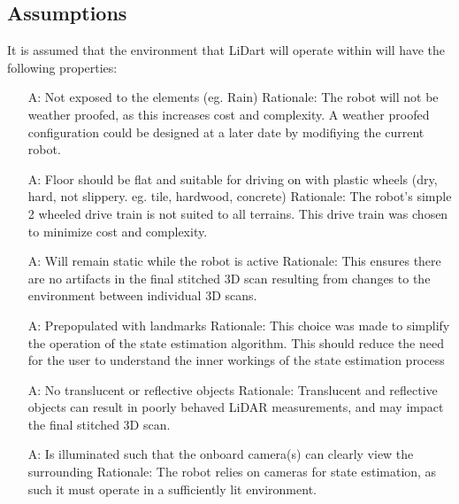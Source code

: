\documentclass[12pt]{article}
\newcounter{assumpnum} %
\begin{document}
\subsection{Assumptions}

It is assumed that the environment that LiDart will operate within will have the following properties:

\noindent \begin{itemize}
\item[A\refstepcounter{assumpnum}\theassumpnum \label{Assumption1}:] Not exposed to the elements (eg. Rain)
\newline Rationale: The robot will not be weather proofed, as this increases cost and complexity. A weather proofed configuration could be designed at a later date by modifiying the current robot.

\item[A\refstepcounter{assumpnum}\theassumpnum \label{Assumption2}:] Floor should be flat and suitable for driving on with plastic wheels (dry, hard, not slippery. eg. tile, hardwood, concrete)
\newline Rationale: The robot's simple 2 wheeled drive train is not suited to all terrains. This drive train was chosen to minimize cost and complexity.

\item[A\refstepcounter{assumpnum}\theassumpnum \label{Assumption3}:] Will remain static while the robot is active
\newline Rationale: This ensures there are no artifacts in the final stitched 3D scan resulting from changes to the environment between individual 3D scans.

\item[A\refstepcounter{assumpnum}\theassumpnum \label{Assumption4}:] Prepopulated with landmarks
\newline Rationale: This choice was made to simplify the operation of the state estimation algorithm. This should reduce the need for the user to understand the inner workings of the state estimation process

\item[A\refstepcounter{assumpnum}\theassumpnum \label{Assumption5}:] No translucent or reflective objects
\newline Rationale: Translucent and reflective objects can result in poorly behaved LiDAR measurements, and may impact the final stitched 3D scan.

\item[A\refstepcounter{assumpnum}\theassumpnum \label{Assumption6}:] Is illuminated such that the onboard camera(s) can clearly view the surrounding
\newline Rationale: The robot relies on cameras for state estimation, as such it must operate in a sufficiently lit environment. 

\end{itemize}
\end{document}
